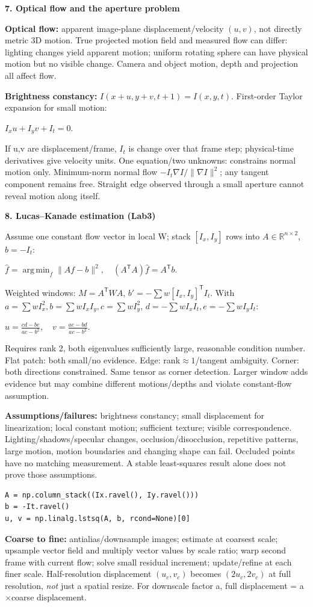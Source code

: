 \documentclass[a4paper]{article}
\newcommand{\key}[1]{\textbf{#1}}
\newcommand{\Topic}[1]{\par\vspace{1.7pt}\noindent
  {\fontsize{7.7}{8.0}\selectfont\bfseries #1}\par\vspace{0.3pt}}
\newcommand{\eq}[1]{\par\noindent\mbox{\(\displaystyle #1\)}\par}
\newcommand{\norm}[1]{\lVert #1\rVert}
\newcommand{\trans}{^{\mathsf T}}
\newcommand{\R}{\mathbb R}
\newcommand{\argmin}{\operatorname*{arg\,min}}
\newcounter{sheet}
\newcounter{sheetcolumn}
\newlength{\colwidth}
\newenvironment{sheetcol}[1][7.0]{\stepcounter{sheetcolumn}
  \begin{lrbox}{\columnbox}\begin{minipage}[t]{\colwidth}\vspace{0pt}
  \fontsize{#1}{\dimexpr#1pt+0.6pt\relax}\selectfont}
  {\end{minipage}\end{lrbox}
  \typeout{CV1COL|\thesheet|\thesheetcolumn|\the\dimexpr\ht\columnbox+\dp\columnbox\relax}
  \usebox{\columnbox}\ignorespacesafterend}
\begin{document}
\begin{sheetcol}
\Topic{7. Optical flow and the aperture problem}
\key{Optical flow:} apparent image-plane displacement/velocity \((u,v)\), not directly metric 3D motion. True projected motion field and measured flow can differ: lighting changes yield apparent motion; uniform rotating sphere can have physical motion but no visible change. Camera and object motion, depth and projection all affect flow.

\key{Brightness constancy:} \(I(x+u,y+v,t+1)=I(x,y,t)\). First-order Taylor expansion for small motion:
\eq{I_xu+I_yv+I_t=0.}
If u,v are displacement/frame, \(I_t\) is change over that frame step; physical-time derivatives give velocity units. One equation/two unknowns: constrains normal motion only. Minimum-norm normal flow \(-I_t\nabla I/\norm{\nabla I}^2\); any tangent component remains free. Straight edge observed through a small aperture cannot reveal motion along itself.

\Topic{8. Lucas--Kanade estimation (Lab3)}
Assume one constant flow vector in local W; stack \([I_x,I_y]\) rows into \(A\in\R^{n\times2}\), \(b=-I_t\):
\eq{\hat f=\argmin_f\norm{Af-b}^2,\quad
 (A\trans A)\hat f=A\trans b.}
Weighted windows: \(M=A\trans WA\), \(b'= -\sum w[I_x,I_y]\trans I_t\). With \(a=\sum wI_x^2,b=\sum wI_xI_y,c=\sum wI_y^2\), \(d=-\sum wI_xI_t,e=-\sum wI_yI_t\):
\eq{u=\frac{cd-be}{ac-b^2},\quad
 v=\frac{ae-bd}{ac-b^2}.}
Requires rank 2, both eigenvalues sufficiently large, reasonable condition number. Flat patch: both small/no evidence. Edge: rank\(\approx1\)/tangent ambiguity. Corner: both directions constrained. Same tensor as corner detection. Larger window adds evidence but may combine different motions/depths and violate constant-flow assumption.

\key{Assumptions/failures:} brightness constancy; small displacement for linearization; local constant motion; sufficient texture; visible correspondence. Lighting/shadows/specular changes, occlusion/disocclusion, repetitive patterns, large motion, motion boundaries and changing shape can fail. Occluded points have no matching measurement. A stable least-squares result alone does not prove those assumptions.
\begin{lstlisting}
A = np.column_stack((Ix.ravel(), Iy.ravel()))
b = -It.ravel()
u, v = np.linalg.lstsq(A, b, rcond=None)[0]
\end{lstlisting}
\key{Coarse to fine:} antialias/downsample images; estimate at coarsest scale; upsample vector field and multiply vector values by scale ratio; warp second frame with current flow; solve small residual increment; update/refine at each finer scale. Half-resolution displacement \((u_c,v_c)\) becomes \((2u_c,2v_c)\) at full resolution, \emph{not} just a spatial resize. For downscale factor a, full displacement = a\(\times\)coarse displacement.


\end{sheetcol}
\end{document}

